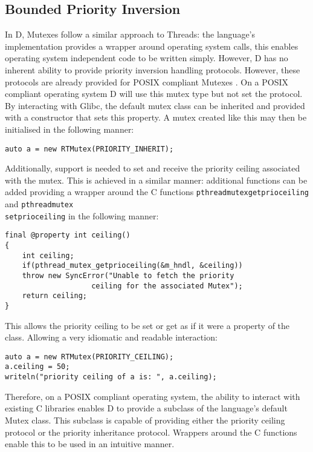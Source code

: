 \subsection{Bounded Priority Inversion}
In D, Mutexes follow a similar approach to Threads: the language's
implementation provides a wrapper around operating system calls, this 
enables operating system independent code to be written simply. However, D has no 
inherent ability to provide priority inversion handling protocols. 
However, these protocols are already provided for POSIX compliant Mutexes 
\cite{mutex-setprotocol}. On a POSIX 
compliant operating system D will use this mutex type but not set the protocol. 
By interacting with Glibc, the default mutex class can be inherited
and provided with a constructor that sets this property.
A mutex created like this may then be initialised in the following manner: 
\begin{lstlisting}
auto a = new RTMutex(PRIORITY_INHERIT);
\end{lstlisting}
Additionally, support is needed to set and receive the priority ceiling 
associated with the mutex. This is achieved in a similar manner: additional 
functions can be added providing a wrapper around the C functions 
\texttt{pthread\textunderscore{}mutex\textunderscore{}getprioceiling} and 
\texttt{pthread\textunderscore{}mutex\textunderscore{}\\setprioceiling}
in the following manner:
\begin{lstlisting}
final @property int ceiling()
{
    int ceiling; 
    if(pthread_mutex_getprioceiling(&m_hndl, &ceiling))
    throw new SyncError("Unable to fetch the priority 
                    ceiling for the associated Mutex"); 
    return ceiling; 
}
\end{lstlisting}
This allows the priority ceiling to be set or get as if it were a property of 
the class. Allowing a very idiomatic and readable interaction: 
\begin{lstlisting}
auto a = new RTMutex(PRIORITY_CEILING); 
a.ceiling = 50; 
writeln("priority ceiling of a is: ", a.ceiling); 
\end{lstlisting}
Therefore, on a POSIX compliant operating system, the ability to interact with 
existing C libraries enables D to provide a subclass of the language's default 
Mutex class. This subclass is capable of providing either the priority ceiling 
protocol or the priority inheritance protocol. Wrappers around the C functions 
enable this to be used in an intuitive manner. 

